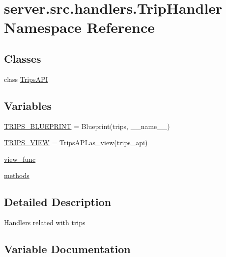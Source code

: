 \hypertarget{namespaceserver_1_1src_1_1handlers_1_1_trip_handler}{}\section{server.\+src.\+handlers.\+Trip\+Handler Namespace Reference}
\label{namespaceserver_1_1src_1_1handlers_1_1_trip_handler}
\subsection*{Classes}
\begin{DoxyCompactItemize}
\item 
class \hyperlink{classserver_1_1src_1_1handlers_1_1_trip_handler_1_1_trips_a_p_i}{Trips\+A\+PI}
\end{DoxyCompactItemize}
\subsection*{Variables}
\begin{DoxyCompactItemize}
\item 
\hyperlink{namespaceserver_1_1src_1_1handlers_1_1_trip_handler_af379acb9ec70b55c14ca89c6d65564e6}{T\+R\+I\+P\+S\+\_\+\+B\+L\+U\+E\+P\+R\+I\+NT} = Blueprint(\textquotesingle{}trips\textquotesingle{}, \+\_\+\+\_\+name\+\_\+\+\_\+)
\item 
\hyperlink{namespaceserver_1_1src_1_1handlers_1_1_trip_handler_a94ec30c88e16689c6cbffd79da2afbd0}{T\+R\+I\+P\+S\+\_\+\+V\+I\+EW} = Trips\+A\+P\+I.\+as\+\_\+view(\textquotesingle{}trips\+\_\+api\textquotesingle{})
\item 
\hyperlink{namespaceserver_1_1src_1_1handlers_1_1_trip_handler_a8c3e5f11f192c958732933ef2cd9ff89}{view\+\_\+func}
\item 
\hyperlink{namespaceserver_1_1src_1_1handlers_1_1_trip_handler_afc7d4f1f42d23429183324dde99b2179}{methods}
\end{DoxyCompactItemize}


\subsection{Detailed Description}
\begin{DoxyVerb}Handlers related with trips\end{DoxyVerb}
 

\subsection{Variable Documentation}
